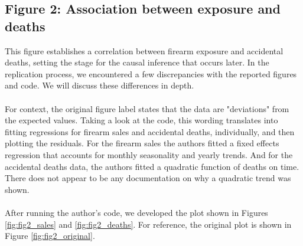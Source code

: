 \documentclass[12pt]{article}%
\begin{document}
\subsection*{Figure 2: Association between exposure and deaths}
This figure establishes a correlation between firearm exposure and accidental deaths, setting the stage for the causal inference that occurs later. In the replication process, we encountered a few discrepancies with the reported figures and code. We will discuss these differences in depth. \\ \\
For context, the original figure label states that the data are "deviations" from the expected values. Taking a look at the code, this wording translates into fitting regressions for firearm sales and accidental deaths, individually, and then plotting the residuals. For the firearm sales the authors fitted a fixed effects regression that accounts for monthly seasonality and yearly trends. And for the accidental deaths data, the authors fitted a quadratic function of deaths on time. There does not appear to be any documentation on why a quadratic trend was shown. \\ \\
After running the author's code, we developed the plot shown in Figures \ref{fig:fig2_sales} and \ref{fig:fig2_deaths}. For reference, the original plot is shown in Figure \ref{fig:fig2_original}. 
\end{document}
